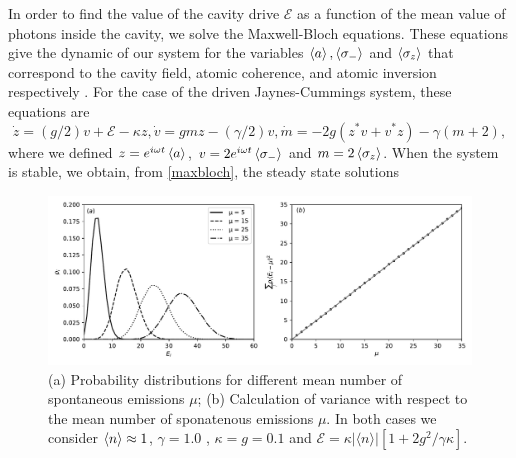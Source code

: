 \documentclass[%
 reprint,
 amsmath,amssymb,
 aps, 
]{revtex4-1}
\begin{document}
In order to find the value of the cavity drive $\mathcal{E}$ as a
function of the mean value of photons inside the cavity, we solve the
Maxwell-Bloch equations. These equations give the dynamic of our
system for the variables $\expval{a}, \expval{\sigma_-}$ and
$\expval{\sigma_z}$ that correspond to the cavity field, atomic
coherence, and atomic inversion respectively \cite{Alsing_1991}. For
the case of the driven Jaynes-Cummings system, these equations are
\begin{subequations} \label{maxbloch}
\begin{equation} \label{bloch1}
\dot{z} = (g/2)v + \mathcal{E} - \kappa z,
\end{equation}
\begin{equation} \label{bloch2}
\dot{v} = gmz - (\gamma/2)v,
\end{equation}
\begin{equation} \label{bloch3}
\dot{m} = -2g(z^*v + v^*z) - \gamma(m + 2),
\end{equation}
\end{subequations} 
where we defined $z = e^{i\omega t}\expval{a}$,
$v = 2e^{i\omega t}\expval{\sigma_-}$ and $m = 2\expval{\sigma_z}$.
When the system is stable, we obtain, from
\eqref{maxbloch}, the steady state
solutions \cite{gagniuc2017markov}
\begin{center}
\begin{figure}[!t]\label{error2}
\begin{center}
\includegraphics[scale = 0.7]{newerrorppp.pdf}
\caption{\small{(a) Probability distributions for different mean number of spontaneous emissions $\mu$; (b) Calculation of variance with respect to the mean number of sponatenous emissions $\mu$. In both cases we consider $\expval{n} \approx 1$, $\gamma = 1.0$ , $\kappa = g = 0.1$ and $\mathcal{E} =  \kappa |\langle n \rangle|[1 + 2g^2/\gamma \kappa]$.}} \label{probdisult}
\end{center}
\end{figure}
\end{center}
\end{document}
